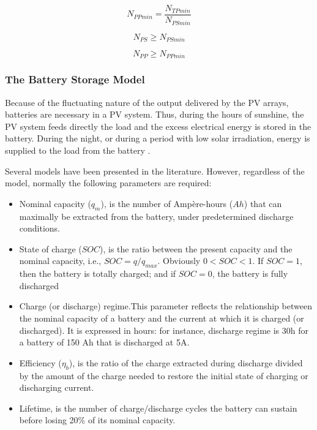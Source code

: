 \begin{equation}
\label{eq:NPPmin}
N_{PPmin} = \dfrac{N_{TPmin}}{N_{PSmin}}
\end{equation}

\begin{equation}
\label{eq:NPS}
N_{PS} \geq N_{PSmin}
\end{equation}

\begin{equation}
\label{eq:NPP}
N_{PP} \geq N_{PPmin}
\end{equation}


\subsubsection{The Battery Storage Model }
Because of the fluctuating nature of the output delivered by the PV arrays, batteries are necessary in a PV system. Thus, during the hours of sunshine, the PV system feeds directly the load and the excess electrical energy is stored in the battery. During the night, or during a period with low solar irradiation, energy is supplied to the load from the battery \cite{Mellit}.
  
Several models have been presented in the literature. However, regardless of the model, normally the following parameters are required: 

\begin{itemize}
\item Nominal capacity ($ q_{m} $), is the number of Ampère-hours ($ Ah $) that can maximally be extracted from the battery, under predetermined discharge conditions.
\item State of charge ($ SOC $), is the ratio between the present capacity and the nominal capacity, i.e., $ SOC = q/q_{max} $. Obviously $ 0<SOC<1 $. If $ SOC=1 $, then the battery is totally charged; and if $ SOC=0 $, the battery is fully discharged
\item Charge (or discharge) regime.This parameter reflects the relationship between the nominal capacity of a battery and the current at which it is charged (or discharged). It is expressed in hours: for instance, discharge regime is 30h for a battery of 150 Ah that is discharged at 5A.
\item Efficiency ($\eta_{b}$), is the ratio of the charge extracted during discharge divided by the amount of the charge needed to restore the initial state of charging or discharging current. 
\item Lifetime, is the number of charge/discharge cycles the battery can sustain before losing 20\% of its nominal capacity.
\end{itemize}

